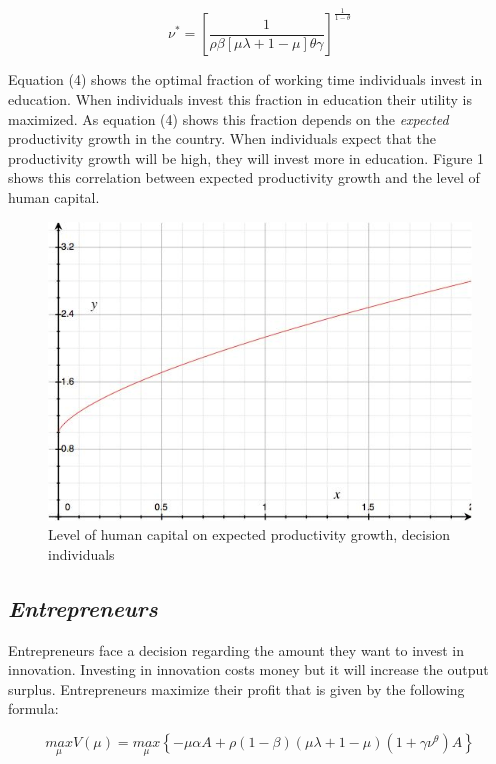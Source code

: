 \documentclass[a4paper,11pt]{article} %
\begin{document}
\begin{equation}
  \nu^{*}=\left[
    \frac{1}{\rho\beta
      \left[\mu\lambda+1-\mu\right]
    \theta\gamma}
  \right]^{\frac{1}{1-\theta}}
\end{equation}

Equation (4) shows the optimal fraction of working time individuals invest in education. When individuals invest this fraction in education their utility is maximized. As equation (4) shows this fraction depends on the \textit{expected} productivity growth in the country. When individuals expect that the productivity growth will be high, they will invest more in education. Figure 1 shows this correlation between expected productivity growth and the level of human capital.

\begin{figure}
  \centering
  \includegraphics{figure1.png}
  \caption{Level of human capital on expected productivity growth, decision individuals}
\end{figure}

\subsection*{\textit{Entrepreneurs}}
Entrepreneurs face a decision regarding the amount they want to invest in innovation. Investing in innovation costs money but it will increase the output surplus. Entrepreneurs maximize their profit that is given by the following formula:

\begin{equation}
\underset{\mu}{max}V(\mu)=
\underset{\mu}{max}
  \left\{-\mu\alpha A+\rho\left(1-\beta\right)\left(\mu\lambda+1-\mu\right)\left(1+\gamma\nu^{\theta}\right)A\right\}
\end{equation}
\end{document}

